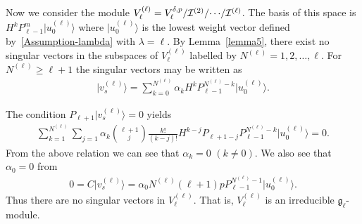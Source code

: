 \documentclass[11pt]{article}
\numberwithin{equation}{section}
\begin{document}
Now we consider the module $ V^{(\ell)}_{\ell} = V^{\delta,p}_{\ell}/{\cal I}^{(2)}/ {\cdots } /{\cal I}^{(\ell)}$.
The basis of this space is $ H^k P_{\ell{-}1}^m \big|u_0^{(\ell)}\big\rangle  $ where $ \big|u_0^{(\ell)}\big\rangle  $ is the lowest weight
vector def\/ined by~\eqref{Assumption-lambda} with $ \lambda = \ell$.
By Lemma~\ref{lemma5}, there exist no singular vectors in the subspaces of $ V^{(\ell)}_{\ell} $ labelled by $
N^{(\ell)} = 1, 2, \dots, \ell$.
For $ N^{(\ell)} \geq \ell+1 $ the singular vectors may be written as
\begin{gather*}
\big|v_s^{(\ell)}\big\rangle  = \sum\limits_{k=0}^{N^{(\ell)}} \alpha_k H^k P_{\ell-1}^{N^{(\ell)}-k} \big|u_0^{(\ell)}\big\rangle .
\end{gather*}

The condition $ P_{\ell+1} \big|v_s^{(\ell)}\big\rangle  = 0 $ yields
\begin{gather*}
\sum\limits_{k=1}^{N^{(\ell)}} \sum\limits_{j=1} \alpha_k \binom{\ell+1}{j} \frac{k!}{(k-j)!} H^{k-j} P_{\ell+1-j}
P_{\ell-1}^{N^{(\ell)}-k} \big|u_0^{(\ell)}\big\rangle  = 0.
\end{gather*}
From the above relation we can see that $ \alpha_k = 0$ $(k \neq 0)$.
We also see that $ \alpha_0 = 0 $ from
\begin{gather*}
0 = C \big|v_s^{(\ell)}\big\rangle  = \alpha_0 N^{(\ell)} (\ell+1) p P_{\ell-1}^{N^{(\ell)}-1} \big|u_0^{(\ell)}\big\rangle .
\end{gather*}
Thus there are no singular vectors in $ V^{(\ell)}_{\ell}$.
That is, $ V^{(\ell)}_{\ell} $ is an irreducible ${\mathfrak g}_{\ell}$-module.
\end{document}

